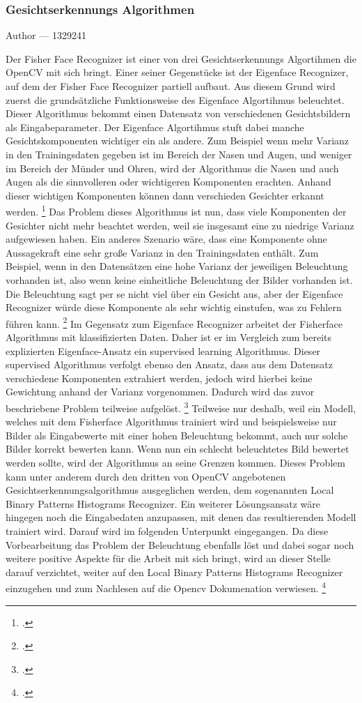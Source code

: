 \documentclass[12pt, a4paper]{report}
\makeatletter
\newcommand{\sectionauthor}[1]{%
  {\parindent0pt\vspace*{-5pt}%
  \large{Author --- }
  \linespread{1.1}\large\scshape#1%
  \par\nobreak\vspace*{35pt} }
  \@afterheading%
}
\makeatother
\begin{document}
\subsubsection{Gesichtserkennungs Algorithmen}
\sectionauthor{1329241}
Der Fisher Face Recognizer ist einer von drei Gesichtserkennungs Algortihmen die OpenCV mit sich bringt. Einer seiner Gegenstücke ist der Eigenface Recognizer, auf dem der Fisher Face Recognizer partiell aufbaut. Aus diesem Grund wird zuerst die grundsätzliche Funktionsweise des Eigenface Algortihmus beleuchtet. Dieser Algorithmus bekommt einen Datensatz von verschiedenen Gesichtsbildern als Eingabeparameter. Der Eigenface Algortihmus stuft dabei manche Gesichtskomponenten wichtiger ein als andere. Zum Beispiel wenn mehr Varianz in den Trainingsdaten gegeben ist im Bereich der Nasen und Augen, und weniger im Bereich der Münder und Ohren, wird der Algorithmus die Nasen und auch Augen als die sinnvolleren oder wichtigeren Komponenten erachten. Anhand dieser wichtigen Komponenten können dann verschieden Gesichter erkannt werden.
\footcite[Vgl.][]{Eigenface}
Das Problem dieses Algorithmus ist nun, dass viele Komponenten der Gesichter nicht mehr beachtet werden, weil sie insgesamt eine zu niedrige Varianz aufgewiesen haben. Ein anderes Szenario wäre, dass eine Komponente ohne Aussagekraft eine sehr große Varianz in den Trainingsdaten enthält. Zum Beispiel, wenn in den Datensätzen eine hohe Varianz der jeweiligen Beleuchtung vorhanden ist, also wenn keine einheitliche Beleuchtung der Bilder vorhanden ist. Die Beleuchtung sagt per se nicht viel über ein Gesicht aus, aber der Eigenface Recognizer würde diese Komponente als sehr wichtig einstufen, was zu Fehlern führen kann.
\footcite[Vgl.][]{Fisherface}
Im Gegensatz zum Eigenface Recognizer arbeitet der Fisherface Algorithmus mit klassifizierten Daten. Daher ist er im Vergleich zum bereits explizierten Eigenface-Ansatz ein supervised learning Algorithmus. Dieser supervised Algorithmus verfolgt ebenso den Ansatz, dass aus dem Datensatz verschiedene Komponenten extrahiert werden, jedoch wird hierbei keine Gewichtung anhand der Varianz vorgenommen. Dadurch wird das zuvor beschriebene Problem teilweise aufgelöst. 
\footcite[Vgl.][How to fix this issue]{Eigenface}
Teilweise nur deshalb, weil ein Modell, welches mit dem Fisherface Algorithmus trainiert wird und beispielsweise nur Bilder als Eingabewerte mit einer hohen Beleuchtung bekommt, auch nur solche Bilder korrekt bewerten kann. Wenn nun ein schlecht beleuchtetes Bild bewertet werden sollte, wird der Algorithmus an seine Grenzen kommen.
Dieses Problem kann unter anderem durch den dritten von OpenCV angebotenen Gesichtserkennungsalgorithmus ausgeglichen werden, dem sogenannten Local Binary Patterns Histograms Recognizer. Ein weiterer Lösungsansatz wäre hingegen noch die Eingabedaten anzupassen, mit denen das resultierenden Modell trainiert wird. Darauf wird im folgenden Unterpunkt \pageref{subsec: Eingabe Daten} eingegangen. Da diese Vorbearbeitung das Problem der Beleuchtung ebenfalls löst und dabei sogar noch weitere positive Aspekte für die Arbeit mit sich bringt, wird an dieser Stelle darauf verzichtet, weiter auf den Local Binary Patterns Histograms Recognizer einzugehen und zum Nachlesen auf die Opencv Dokumenation verwiesen. 
\footcite[Vgl.][]{Recognizer} 
\end{document}
